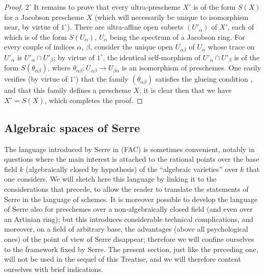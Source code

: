 \begin{proof}
$2^\circ$ It remains to prove that every ultra-prescheme $X'$ is of the form $S(X)$ for a Jacobson prescheme $X$ (which will necessarily be unique to isomorphism near, by virtue of $1^\circ$).
There are ultra-affine open subsets $(U'_\alpha)$ of $X'$, each of which is of the form $S(U_\alpha)$, $U_\alpha$ being the spectrum of a Jacobson ring.
For every couple of indices $\alpha$, $\beta$, consider the unique open $U_{\alpha\beta}$ of $U_\alpha$ whose trace on $U'_\alpha$ is $U'_\alpha\cap U'_\beta$; by virtue of $1^\circ$, the identical self-morphism of $U'_\alpha\cap U'_\beta$ is of the form $S(\theta_{\alpha\beta})$, where $\theta_{\alpha\beta}:U_{\alpha\beta}\to U_{\beta\alpha}$ is an isomorphism of preschemes.
One easily verifies (by virtue of $1^\circ$) that the family $(\theta_{\alpha\beta})$ satisfies the glueing condition , and that this family defines a prescheme $X$; it is clear then that we have $X'=S(X)$, which completes the proof.
\end{proof}

\subsection{Algebraic spaces of Serre}
\label{subsection:IV.10.10}

\begin{env}[10.10.1]
\label{IV.10.10.1}
The language introduced by Serre in (FAC) is sometimes convenient, notably in questions where the main interest is attached to the rational points over the base field $k$ (algebraically closed by hypothesis) of the ``algebraic varieties'' over $k$ that one considers.
We will sketch here this language by linking it to the considerations that precede, to allow the reader to translate the statements of Serre in the language of schemes.
It is moreover possible to develop the language of Serre also for preschemes over a non-algebraically closed field (and even over an Artinian ring); but this introduces considerable technical complications, and moreover, on a field of arbitrary base, the advantages (above all psychological ones) of the point of view of Serre disappear; therefore we will confine ourselves to the framework fixed by Serre.
The present section, just like the preceding one, will not be used in the sequel of this Treatise, and we will therefore content ourselves with brief indications.
\end{env}


